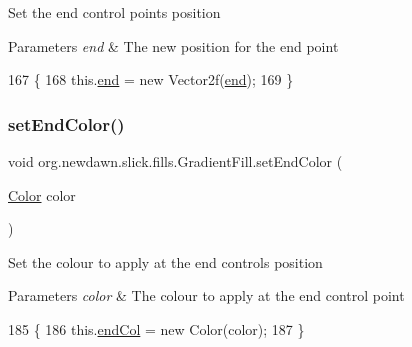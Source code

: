 Set the end control point\textquotesingle{}s position


\begin{DoxyParams}{Parameters}
{\em end} & The new position for the end point \\
\hline
\end{DoxyParams}

\begin{DoxyCode}
167                                      \{
168         this.\mbox{\hyperlink{classorg_1_1newdawn_1_1slick_1_1fills_1_1_gradient_fill_ad061e535f20522d5170bfad1354480c6}{end}} = \textcolor{keyword}{new} Vector2f(\mbox{\hyperlink{classorg_1_1newdawn_1_1slick_1_1fills_1_1_gradient_fill_ad061e535f20522d5170bfad1354480c6}{end}});
169     \}
\end{DoxyCode}
\mbox{\label{classorg_1_1newdawn_1_1slick_1_1fills_1_1_gradient_fill_a870476f2e0a84a105e3cb75e7d0d8fa9}} 
\subsubsection{\texorpdfstring{set\+End\+Color()}{setEndColor()}}
{\footnotesize\ttfamily void org.\+newdawn.\+slick.\+fills.\+Gradient\+Fill.\+set\+End\+Color (\begin{DoxyParamCaption}\item[{\mbox{\hyperlink{classorg_1_1newdawn_1_1slick_1_1_color}{Color}}}]{color }\end{DoxyParamCaption})\hspace{0.3cm}{\ttfamily [inline]}}

Set the colour to apply at the end control\textquotesingle{}s position


\begin{DoxyParams}{Parameters}
{\em color} & The colour to apply at the end control point \\
\hline
\end{DoxyParams}

\begin{DoxyCode}
185                                          \{
186         this.\mbox{\hyperlink{classorg_1_1newdawn_1_1slick_1_1fills_1_1_gradient_fill_adcf5fb0ed0705120166e3ae2fd6ab352}{endCol}} = \textcolor{keyword}{new} Color(color);
187     \}
\end{DoxyCode}
\mbox{\label{classorg_1_1newdawn_1_1slick_1_1fills_1_1_gradient_fill_aa3929927213e8dc0aa5c2c2438ecee9d}} 
